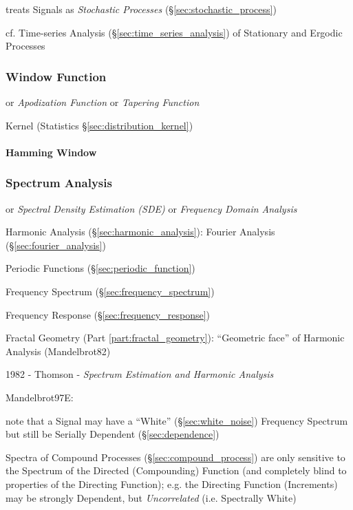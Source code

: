 treats Signals as \emph{Stochastic Processes} (\S\ref{sec:stochastic_process})

\fist cf. Time-series Analysis (\S\ref{sec:time_series_analysis}) of Stationary
and Ergodic Processes



\subsubsection{Window Function}\label{sec:window_function}

or \emph{Apodization Function} or \emph{Tapering Function}

\fist Kernel (Statistics \S\ref{sec:distribution_kernel})



\paragraph{Hamming Window}\label{sec:hamming_window}\hfill



\subsubsection{Spectrum Analysis}\label{sec:spectrum_analysis}

or \emph{Spectral Density Estimation (SDE)} or \emph{Frequency Domain Analysis}

Harmonic Analysis (\S\ref{sec:harmonic_analysis}): Fourier Analysis
(\S\ref{sec:fourier_analysis})

Periodic Functions (\S\ref{sec:periodic_function})

Frequency Spectrum (\S\ref{sec:frequency_spectrum})

\fist Frequency Response (\S\ref{sec:frequency_response})

\fist Fractal Geometry (Part \ref{part:fractal_geometry}): ``Geometric face'' of
Harmonic Analysis (Mandelbrot82)

1982 - Thomson - \emph{Spectrum Estimation and Harmonic Analysis}

Mandelbrot97E:

note that a Signal may have a ``White'' (\S\ref{sec:white_noise}) Frequency
Spectrum but still be Serially Dependent (\S\ref{sec:dependence})

Spectra of Compound Processes (\S\ref{sec:compound_process}) are only sensitive
to the Spectrum of the Directed (Compounding) Function (and completely blind to
properties of the Directing Function); e.g. the Directing Function (Increments)
may be strongly Dependent, but \emph{Uncorrelated} (i.e. Spectrally White)

